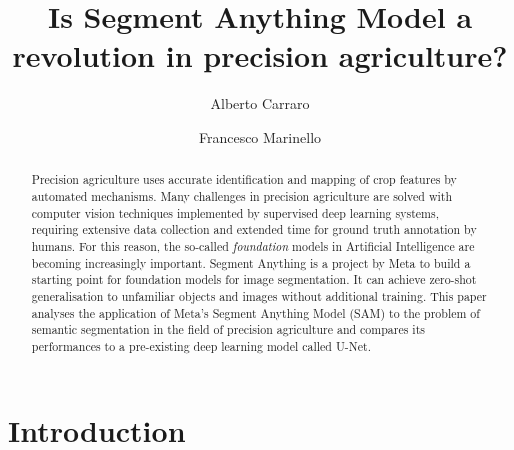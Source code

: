 \documentclass[runningheads]{llncs}
\begin{document}
%
\title{Is Segment Anything Model a revolution in precision agriculture?}
%
%


\author{
Alberto Carraro
\and
Francesco Marinello
}
%
%
\maketitle              %
%
\begin{abstract}
Precision agriculture uses accurate identification and mapping of crop features by automated mechanisms. Many challenges in precision agriculture are solved with computer vision techniques implemented by supervised deep learning systems, requiring extensive data collection and extended time for ground truth annotation by humans. For this reason, the so-called \emph{foundation} models in Artificial Intelligence are becoming increasingly important. Segment Anything is a project by Meta to build a starting point for foundation models for image segmentation. It can achieve zero-shot generalisation to unfamiliar objects and images without additional training. This paper analyses the application of Meta's Segment Anything Model (SAM) to the problem of semantic segmentation in the field of precision agriculture and compares its performances to a pre-existing deep learning model called U-Net. 
\end{abstract}

\section{Introduction}
\end{document}

